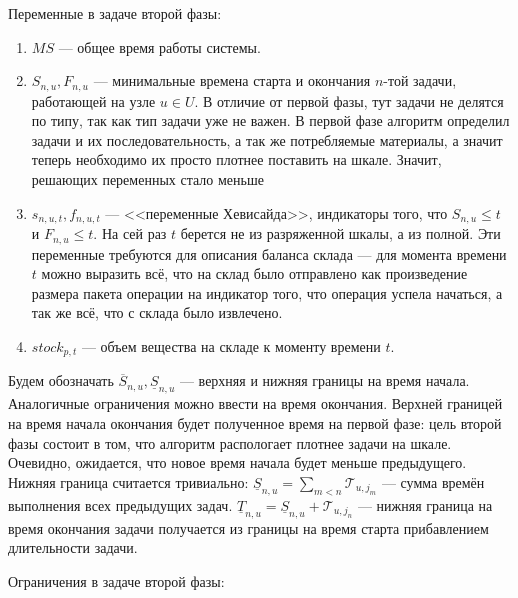 \documentclass[12pt, twoside]{article}
\theoremstyle{definition}
\newcommand{\Tau}{\mathcal{T}}
\begin{document}
Переменные в задаче второй фазы:

\begin{enumerate}

\item $MS$ --- общее время работы системы.
\item $S_{n, u}, F_{n, u}$ --- минимальные времена старта и окончания $n$-той задачи, работающей на узле $u \in U$. В отличие от первой фазы, тут задачи не делятся по типу, так как тип задачи уже не важен. В первой фазе алгоритм определил задачи и их последовательность, а так же потребляемые материалы, а значит теперь необходимо их просто плотнее поставить на шкале. Значит, решающих переменных стало меньше
\item $s_{n, u, t}, f_{n, u, t}$ --- <<переменные Хевисайда>>, индикаторы того, что $S_{n, u} \leq t$ и $F_{n, u} \leq t$. На сей раз $t$ берется не из разряженной шкалы, а из полной. Эти переменные требуются для описания баланса склада --- для момента времени $t$ можно выразить всё, что на склад было отправлено как произведение размера пакета операции на индикатор того, что операция успела начаться, а так же всё, что с склада было извлечено.
\item $stock_{p, t}$ --- объем вещества на складе к моменту времени $t$.

\end{enumerate}

Будем обозначать $\overline S_{n, u}, \underline S_{n, u}$ --- верхняя и нижняя границы на время начала. Аналогичные ограничения можно ввести на время окончания. Верхней границей на время начала окончания будет полученное время на первой фазе: цель второй фазы состоит в том, что алгоритм распологает плотнее задачи на шкале. Очевидно, ожидается, что новое время начала будет меньше предыдущего. Нижняя граница считается тривиально: $\underline S_{n, u} = \displaystyle\sum_{m < n} \Tau_{u, j_m}$ --- сумма времён выполнения всех предыдущих задач. $\underline T_{n, u} = \underline S_{n, u} + \Tau_{u, j_n}$ --- нижняя граница на время окончания задачи получается из границы на время старта прибавлением длительности задачи.

Ограничения в задаче второй фазы:
\end{document}
